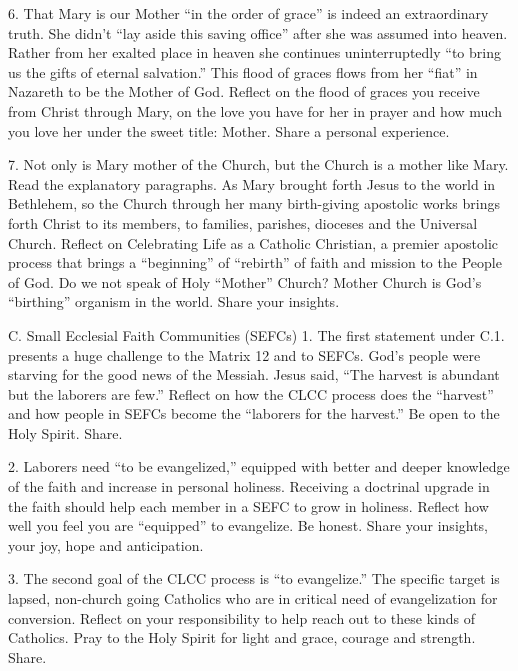 \documentclass[oneside]{book}
\begin{document}
6. That Mary is our Mother ``in the order of grace'' is indeed an extraordinary
truth. She didn't ``lay aside this saving office'' after she was assumed into
heaven. Rather from her exalted place in heaven she continues uninterruptedly
``to bring us the gifts of eternal salvation.'' This flood of graces flows from
her ``fiat'' in Nazareth to be the Mother of God. Reflect on the flood of graces
you receive from Christ through Mary, on the love you have for her in prayer and
how much you love her under the sweet title: Mother. Share a personal
experience.

7. Not only is Mary mother of the Church, but the Church is a mother like
Mary. Read the explanatory paragraphs. As Mary brought forth Jesus to the world
in Bethlehem, so the Church through her many birth-giving apostolic works brings
forth Christ to its members, to families, parishes, dioceses and the Universal
Church. Reflect on Celebrating Life as a Catholic Christian, a premier apostolic
process that brings a ``beginning'' of ``rebirth'' of faith and mission to the
People of God. Do we not speak of Holy ``Mother'' Church?  Mother Church is
God's ``birthing'' organism in the world. Share your insights.

C. Small Ecclesial Faith Communities (SEFCs)
1. The first statement under C.1. presents a huge challenge to the Matrix 12 and
to SEFCs. God's people were starving for the good news of the Messiah. Jesus
said, ``The harvest is abundant but the laborers are few.'' Reflect on how the
CLCC process does the ``harvest'' and how people in SEFCs become the ``laborers
for the harvest.'' Be open to the Holy Spirit. Share.

2. Laborers need ``to be evangelized,'' equipped with better and deeper
knowledge of the faith and increase in personal holiness. Receiving a doctrinal
upgrade in the faith should help each member in a SEFC to grow in
holiness. Reflect how well you feel you are ``equipped'' to evangelize. Be
honest. Share your insights, your joy, hope and anticipation.

3. The second goal of the CLCC process is ``to evangelize.'' The specific target
is lapsed, non-church going Catholics who are in critical need of evangelization
for conversion. Reflect on your responsibility to help reach out to these kinds
of Catholics. Pray to the Holy Spirit for light and grace, courage and
strength. Share.
\end{document}
